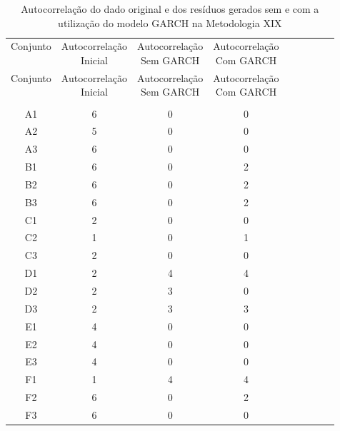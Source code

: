 \begin{center}
\begin{longtable}{ccccc|cccc}
\toprule
\rowcolor{white}
\caption[Metodologia XIX: evolução da autocorrelação]{Autocorrelação do dado
original e dos resíduos gerados sem e com a utilização do modelo GARCH na
Metodologia XIX} \label{tab:EvolucaoAutocorrelacaoMet19}\\
\midrule
Conjunto & \specialcell{Autocorrelação\\Inicial} & \specialcell{Autocorrelação\\Sem
GARCH} & \specialcell{Autocorrelação\\Com GARCH} \\
\midrule
\endfirsthead 
\midrule
\rowcolor{white}
Conjunto & \specialcell{Autocorrelação\\Inicial} & \specialcell{Autocorrelação\\Sem
GARCH} & \specialcell{Autocorrelação\\Com GARCH} \\
\toprule
\endhead
\midrule \\ %
\endfoot
\bottomrule 
\endlastfoot
A1    & 6     & 0     & 0 \\
A2    & 5     & 0     & 0 \\
A3    & 6     & 0     & 0 \\
B1    & 6     & 0     & 2 \\
B2    & 6     & 0     & 2 \\
B3    & 6     & 0     & 2 \\
C1    & 2     & 0     & 0 \\
C2    & 1     & 0     & 1 \\
C3    & 2     & 0     & 0 \\
D1    & 2     & 4     & 4 \\
D2    & 2     & 3     & 0 \\
D3    & 2     & 3     & 3 \\
E1    & 4     & 0     & 0 \\
E2    & 4     & 0     & 0 \\
E3    & 4     & 0     & 0 \\
F1    & 1     & 4     & 4 \\
F2    & 6     & 0     & 2 \\
F3    & 6     & 0     & 0 \\

\end{longtable}
\end{center}
